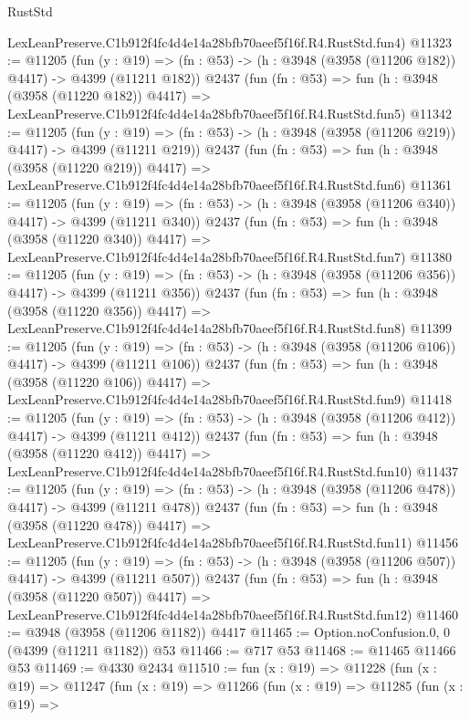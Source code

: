 \begin{lexlean}{RustStd}
\begin{coremodule}
    LexLeanPreserve.C1b912f4fc4d4e14a28bfb70aeef5f16f.R4.RustStd.fun4)
@11323 := @11205
    (fun (y : @19) => (fn : @53) -> (h : @3948 (@3958 (@11206 @182)) @4417) -> @4399 (@11211 @182))
    @2437
    (fun (fn : @53) =>
    fun (h : @3948 (@3958 (@11220 @182)) @4417) =>
    LexLeanPreserve.C1b912f4fc4d4e14a28bfb70aeef5f16f.R4.RustStd.fun5)
@11342 := @11205
    (fun (y : @19) => (fn : @53) -> (h : @3948 (@3958 (@11206 @219)) @4417) -> @4399 (@11211 @219))
    @2437
    (fun (fn : @53) =>
    fun (h : @3948 (@3958 (@11220 @219)) @4417) =>
    LexLeanPreserve.C1b912f4fc4d4e14a28bfb70aeef5f16f.R4.RustStd.fun6)
@11361 := @11205
    (fun (y : @19) => (fn : @53) -> (h : @3948 (@3958 (@11206 @340)) @4417) -> @4399 (@11211 @340))
    @2437
    (fun (fn : @53) =>
    fun (h : @3948 (@3958 (@11220 @340)) @4417) =>
    LexLeanPreserve.C1b912f4fc4d4e14a28bfb70aeef5f16f.R4.RustStd.fun7)
@11380 := @11205
    (fun (y : @19) => (fn : @53) -> (h : @3948 (@3958 (@11206 @356)) @4417) -> @4399 (@11211 @356))
    @2437
    (fun (fn : @53) =>
    fun (h : @3948 (@3958 (@11220 @356)) @4417) =>
    LexLeanPreserve.C1b912f4fc4d4e14a28bfb70aeef5f16f.R4.RustStd.fun8)
@11399 := @11205
    (fun (y : @19) => (fn : @53) -> (h : @3948 (@3958 (@11206 @106)) @4417) -> @4399 (@11211 @106))
    @2437
    (fun (fn : @53) =>
    fun (h : @3948 (@3958 (@11220 @106)) @4417) =>
    LexLeanPreserve.C1b912f4fc4d4e14a28bfb70aeef5f16f.R4.RustStd.fun9)
@11418 := @11205
    (fun (y : @19) => (fn : @53) -> (h : @3948 (@3958 (@11206 @412)) @4417) -> @4399 (@11211 @412))
    @2437
    (fun (fn : @53) =>
    fun (h : @3948 (@3958 (@11220 @412)) @4417) =>
    LexLeanPreserve.C1b912f4fc4d4e14a28bfb70aeef5f16f.R4.RustStd.fun10)
@11437 := @11205
    (fun (y : @19) => (fn : @53) -> (h : @3948 (@3958 (@11206 @478)) @4417) -> @4399 (@11211 @478))
    @2437
    (fun (fn : @53) =>
    fun (h : @3948 (@3958 (@11220 @478)) @4417) =>
    LexLeanPreserve.C1b912f4fc4d4e14a28bfb70aeef5f16f.R4.RustStd.fun11)
@11456 := @11205
    (fun (y : @19) => (fn : @53) -> (h : @3948 (@3958 (@11206 @507)) @4417) -> @4399 (@11211 @507))
    @2437
    (fun (fn : @53) =>
    fun (h : @3948 (@3958 (@11220 @507)) @4417) =>
    LexLeanPreserve.C1b912f4fc4d4e14a28bfb70aeef5f16f.R4.RustStd.fun12)
@11460 := @3948 (@3958 (@11206 @1182)) @4417
@11465 := Option.noConfusion.{0, 0} (@4399 (@11211 @1182)) @53
@11466 := @717 @53
@11468 := @11465 @11466 @53
@11469 := @4330 @2434
@11510 := fun (x : @19) =>
  @11228
    (fun (x : @19) =>
    @11247
      (fun (x : @19) =>
      @11266
        (fun (x : @19) =>
        @11285
          (fun (x : @19) =>

\end{coremodule}
\end{lexlean}
